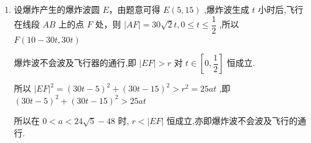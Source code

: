 \begin{enumerate}
\begin{jieda}
\begin{enumerate}
            
            \item 设爆炸产生的爆炸波圆 $E$，由题意可得 $E\left( {5,{15}}\right)$ ,爆炸波生成 $t$ 小时后,飞行在线段 ${AB}$ 上的点 $F$ 处，则 $\left| {AF}\right|  = {30}\sqrt{2}t,0 \leq  t \leq  \dfrac{1}{2}$ ,所以 $F\left( {{10} - {30t},{30t}}\right)$
            
            爆炸波不会波及飞行器的通行,即 $\left| {EF}\right|  > r$ 对 $t \in  \left\lbrack  {0,\dfrac{1}{2}}\right\rbrack$ 恒成立.
            
            所以 ${\left| EF\right| }^{2} = {\left( {30}t - 5\right) }^{2} + {\left( {30}t - {15}\right) }^{2} > {r}^{2} = {25at}$ ,即 ${\left( {30}t - 5\right) }^{2} + {\left( {30}t - {15}\right) }^{2} > {25at}$


            所以在 $0 < a < {24}\sqrt{5} - {48}$ 时, $r < \left| {EF}\right|$ 恒成立,亦即爆炸波不会波及飞行的通行.
        \end{enumerate}
    \end{jieda}


\end{enumerate}

